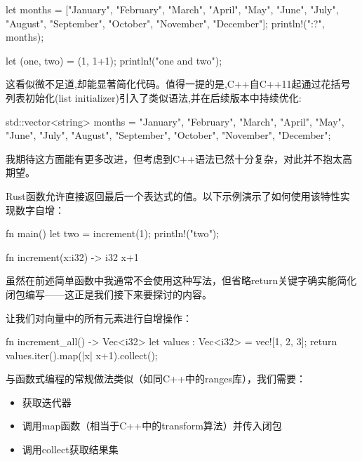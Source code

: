 \begin{rust}
let months = ["January", "February", "March", "April", "May", "June", "July", "August", "September", "October", "November", "December"];
println!("{:?}", months);

let (one, two) = (1, 1+1);
println!("{one} and {two}");
\end{rust}

这看似微不足道,却能显著简化代码。值得一提的是,C++自C++11起通过花括号列表初始化(list initializer)引入了类似语法,并在后续版本中持续优化:

\begin{rust}
std::vector<string> months = {"January", "February", "March", "April", "May", "June", "July", "August", "September", "October", "November", "December"};
\end{rust}

我期待这方面能有更多改进，但考虑到C++语法已然十分复杂，对此并不抱太高期望。


Rust函数允许直接返回最后一个表达式的值。以下示例演示了如何使用该特性实现数字自增：

\begin{rust}
fn main() {
  let two = increment(1);
  println!("{two}");
}

fn increment(x:i32) -> i32{
  x+1
}
\end{rust}

虽然在前述简单函数中我通常不会使用这种写法，但省略return关键字确实能简化闭包编写——这正是我们接下来要探讨的内容。



让我们对向量中的所有元素进行自增操作：

\begin{rust}
fn increment_all() -> Vec<i32>{
  let values : Vec<i32> = vec![1, 2, 3];
  return values.iter().map(|x| x+1).collect();
}
\end{rust}

与函数式编程的常规做法类似（如同C++中的ranges库），我们需要：

\begin{itemize}
\item 
获取迭代器

\item 
调用map函数（相当于C++中的transform算法）并传入闭包

\item 
调用collect获取结果集
\end{itemize}

